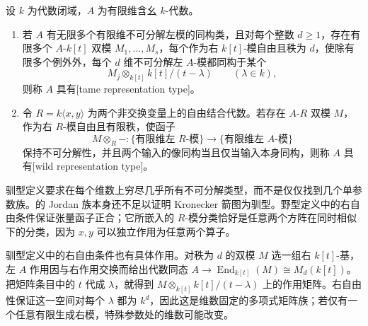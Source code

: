 \begin{definition}\label{b5:def:tame-wild-type}
	设 \(k\) 为代数闭域，\(A\) 为有限维含幺 \(k\)-代数。
	\begin{enumerate}
		\item 若 \(A\) 有无限多个有限维不可分解左模的同构类，且对每个整数 \(d\geq1\)，存在有限多个 \(A\)-\(k[t]\) 双模 \(M_1,\ldots,M_s\)，每个作为右 \(k[t]\)-模自由且秩为 \(d\)，使除有限多个例外外，每个 \(d\) 维不可分解左 \(A\)-模都同构于某个
			\[
				M_j\otimes_{k[t]}k[t]/(t-\lambda)\qquad(\lambda\in k),
			\]
			则称 \(A\) 具有[tame representation type]。
		\item 令 \(R=k\langle x,y\rangle\) 为两个非交换变量上的自由结合代数。若存在 \(A\)-\(R\) 双模 \(M\)，作为右 \(R\)-模自由且有限秩，使函子
			\[
				M\otimes_R-:\{\text{有限维左 }R\text{-模}\} \longrightarrow\{\text{有限维左 }A\text{-模}\}
			\]
			保持不可分解性，并且两个输入的像同构当且仅当输入本身同构，则称 \(A\) 具有[wild representation type]。
	\end{enumerate}
\end{definition}

驯型定义要求在每个维数上穷尽几乎所有不可分解类型，而不是仅仅找到几个单参数族。的 Jordan 族本身还不足以证明 Kronecker 箭图为驯型。野型定义中的右自由条件保证张量函子正合；它所嵌入的 \(R\)-模分类恰好是任意两个方阵在同时相似下的分类，因为 \(x,y\) 可以独立作用为任意两个算子。

\ProseParagraphBreak

驯型定义中的右自由条件也有具体作用。对秩为 \(d\) 的双模 \(M\) 选一组右 \(k[t]\)-基，左 \(A\) 作用因与右作用交换而给出代数同态 \(A\to\operatorname{End}_{k[t]}(M)\cong M_d(k[t])\)。把矩阵条目中的 \(t\) 代成 \(\lambda\)，就得到 \(M\otimes_{k[t]}k[t]/(t-\lambda)\) 上的作用矩阵。右自由性保证这一空间对每个 \(\lambda\) 都为 \(k^d\)，因此这是维数固定的多项式矩阵族；若仅有一个任意有限生成右模，特殊参数处的维数可能改变。

